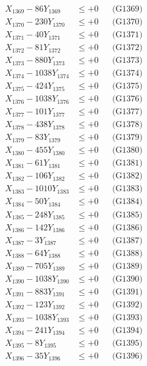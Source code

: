 \documentclass[a4paper,10pt]{article}
\begin{document}
{\begin{align}
X_{1369} - 86Y_{1369} &\leq +0 && \text{(G1369)} \\
X_{1370} - 230Y_{1370} &\leq +0 && \text{(G1370)} \\
\allowbreak
X_{1371} - 40Y_{1371} &\leq +0 && \text{(G1371)} \\
X_{1372} - 81Y_{1372} &\leq +0 && \text{(G1372)} \\
X_{1373} - 880Y_{1373} &\leq +0 && \text{(G1373)} \\
X_{1374} - 1038Y_{1374} &\leq +0 && \text{(G1374)} \\
X_{1375} - 424Y_{1375} &\leq +0 && \text{(G1375)} \\
X_{1376} - 1038Y_{1376} &\leq +0 && \text{(G1376)} \\
X_{1377} - 101Y_{1377} &\leq +0 && \text{(G1377)} \\
X_{1378} - 438Y_{1378} &\leq +0 && \text{(G1378)} \\
X_{1379} - 83Y_{1379} &\leq +0 && \text{(G1379)} \\
X_{1380} - 455Y_{1380} &\leq +0 && \text{(G1380)} \\
\allowbreak
X_{1381} - 61Y_{1381} &\leq +0 && \text{(G1381)} \\
X_{1382} - 106Y_{1382} &\leq +0 && \text{(G1382)} \\
X_{1383} - 1010Y_{1383} &\leq +0 && \text{(G1383)} \\
X_{1384} - 50Y_{1384} &\leq +0 && \text{(G1384)} \\
X_{1385} - 248Y_{1385} &\leq +0 && \text{(G1385)} \\
X_{1386} - 142Y_{1386} &\leq +0 && \text{(G1386)} \\
X_{1387} - 3Y_{1387} &\leq +0 && \text{(G1387)} \\
X_{1388} - 64Y_{1388} &\leq +0 && \text{(G1388)} \\
X_{1389} - 705Y_{1389} &\leq +0 && \text{(G1389)} \\
X_{1390} - 1038Y_{1390} &\leq +0 && \text{(G1390)} \\
\allowbreak
X_{1391} - 883Y_{1391} &\leq +0 && \text{(G1391)} \\
X_{1392} - 123Y_{1392} &\leq +0 && \text{(G1392)} \\
X_{1393} - 1038Y_{1393} &\leq +0 && \text{(G1393)} \\
X_{1394} - 241Y_{1394} &\leq +0 && \text{(G1394)} \\
X_{1395} - 8Y_{1395} &\leq +0 && \text{(G1395)} \\
X_{1396} - 35Y_{1396} &\leq +0 && \text{(G1396)} \\

\end{align}}
\end{document}
